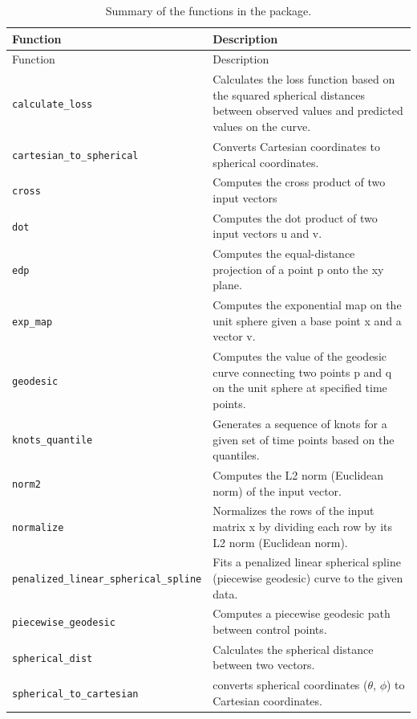 \begin{longtable}[]{@{}
  >{\raggedright\arraybackslash}p{}
  >{\raggedright\arraybackslash}p{}@{}}
\caption{\label{tab:pakcage-functions} Summary of the functions in the  package.}\tabularnewline
\toprule\noalign{}
\begin{minipage}[b]{\linewidth}\raggedright
Function
\end{minipage} & \begin{minipage}[b]{\linewidth}\raggedright
Description
\end{minipage} \\
\midrule\noalign{}
\endfirsthead
\toprule\noalign{}
\begin{minipage}[b]{\linewidth}\raggedright
Function
\end{minipage} & \begin{minipage}[b]{\linewidth}\raggedright
Description
\end{minipage} \\
\midrule\noalign{}
\endhead
\bottomrule\noalign{}
\endlastfoot
\texttt{calculate\_loss} & Calculates the loss function based on the squared spherical distances between observed values and predicted values on the curve. \\
\texttt{cartesian\_to\_spherical} & Converts Cartesian coordinates to spherical coordinates. \\
\texttt{cross} & Computes the cross product of two input vectors \\
\texttt{dot} & Computes the dot product of two input vectors u and v. \\
\texttt{edp} & Computes the equal-distance projection of a point p onto the xy plane. \\
\texttt{exp\_map} & Computes the exponential map on the unit sphere given a base point x and a vector v. \\
\texttt{geodesic} & Computes the value of the geodesic curve connecting two points p and q on the unit sphere at specified time points. \\
\texttt{knots\_quantile} & Generates a sequence of knots for a given set of time points based on the quantiles. \\
\texttt{norm2} & Computes the L2 norm (Euclidean norm) of the input vector. \\
\texttt{normalize} & Normalizes the rows of the input matrix x by dividing each row by its L2 norm (Euclidean norm). \\
\texttt{penalized\_linear\_spherical\_spline} & Fits a penalized linear spherical spline (piecewise geodesic) curve to the given data. \\
\texttt{piecewise\_geodesic} & Computes a piecewise geodesic path between control points. \\
\texttt{spherical\_dist} & Calculates the spherical distance between two vectors. \\
\texttt{spherical\_to\_cartesian} & converts spherical coordinates (\(\theta\), \(\phi\)) to Cartesian coordinates. \\
\end{longtable}

